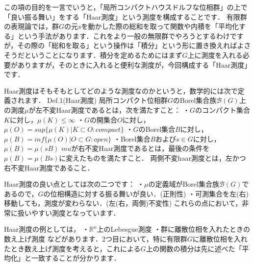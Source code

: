 

この項の目的を一言でいうと，「局所コンパクトハウスドルフな位相群」の上で「良い振る舞い」をする「Haar測度」という測度を構成することです．
有限群の表現論では，群$G$の元$s$を動かした際の総和を取って関数や内積を「平均化する」という手法があります．これをより一般の無限群でやろうとするわけですが，その際の「総和を取る」という操作は「積分」という形に置き換えればよさそうだということになります．積分を定めるためにはまず$G$上に測度を入れる必要がありますが，そのときに入れると便利な測度が，今回構成する「Haar測度」です．

Haar測度はそもそもとしてどのような測度なのかというと，数学的には次で定義されます．
Def.1(Haar測度)
局所コンパクト位相群$G$のBorel集合族$\mathscr{B}(G)$上の測度$\mu$が左不変Haar測度であるとは，次を満たすこと：
・$G$のコンパクト集合$K$に対し，$\mu(K) \le \infty$
・$G$の開集合$O$に対し，$\mu(O)=sup \{ \mu(K) | K \subset O \colon compact \}$
・$G$のBorel集合$B$に対し，$\mu(B)=inf \{ \mu(O) | O \subset G \colon open \}$
・Borel集合$B$および$s \in G$に対し，$\mu (B) = \mu (sB)$
$mu$が右不変Haar測度であるとは，最後の条件を$\mu (B) = \mu (Bs)$に変えたものを満たすこと．
両側不変haar測度とは，左かつ右不変Haar測度であること．

Haar測度の良い点としては次の二つです：
・$\mu$の定義域がBorel集合族$\mathscr{B}(G)$であるので，$G$の位相構造に対する振る舞いが良い．(正則性)
・可測集合を左(右)移動しても，測度が変わらない．(左(右，両側)不変性)
これらの点において，非常に扱いやすい測度となっています．

Haar測度の例としては，
・$\mathbb{R}^n$上のLebesgue測度
・群に離散位相を入れたときの数え上げ測度
などがあります．2つ目において，特に有限群$G$に離散位相を入れたとき数え上げ測度を考えると，これによる$G$上の関数の積分は先に述べた「平均化」と一致することが分かります．

